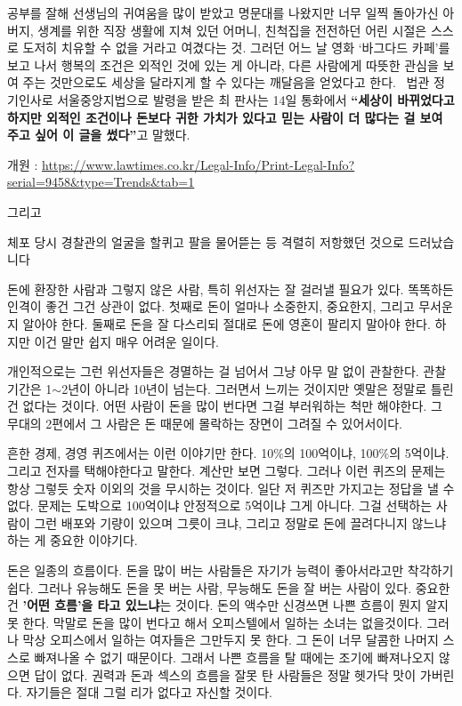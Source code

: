 공부를 잘해 선생님의 귀여움을 많이 받았고 명문대를 나왔지만 너무 일찍 돌아가신 아버지, 생계를 위한 직장 생활에 지쳐 있던 어머니, 친척집을 전전하던 어린 시절은 스스로 도저히 치유할 수 없을 거라고 여겼다는 것.
그러던 어느 날 영화 ‘바그다드 카페’를 보고 나서 행복의 조건은 외적인 것에 있는 게 아니라, 다른 사람에게 따뜻한 관심을 보여 주는 것만으로도 세상을 달라지게 할 수 있다는 깨달음을 얻었다고 한다.  법관 정기인사로 서울중앙지법으로 발령을 받은 최 판사는 14일 통화에서 \textbf{“세상이 바뀌었다고 하지만 외적인 조건이나 돈보다 귀한 가치가 있다고 믿는 사람이 더 많다는 걸 보여 주고 싶어 이 글을 썼다”}고 말했다.
\vspace{5mm}

개원 : \url{https://www.lawtimes.co.kr/Legal-Info/Print-Legal-Info?serial=9458&type=Trends&tab=1}
\vspace{5mm}

그리고
\vspace{5mm}

체포 당시 경찰관의 얼굴을 할퀴고 팔을 물어뜯는 등 격렬히 저항했던 것으로 드러났습니다
\vspace{5mm}

돈에 환장한 사람과 그렇지 않은 사람, 특히 위선자는 잘 걸러낼 필요가 있다.
똑똑하든 인격이 좋건 그건 상관이 없다.
첫째로 돈이 얼마나 소중한지, 중요한지, 그리고 무서운지 알아야 한다.
둘째로 돈을 잘 다스리되 절대로 돈에 영혼이 팔리지 말아야 한다.
하지만 이건 말만 쉽지 매우 어려운 일이다.
\vspace{5mm}

개인적으로는 그런 위선자들은 경멸하는 걸 넘어서 그냥 아무 말 없이 관찰한다. 관찰기간은 1$\sim$2년이 아니라 10년이 넘는다.
그러면서 느끼는 것이지만 옛말은 정말로 틀린 건 없다는 것이다.
어떤 사람이 돈을 많이 번다면 그걸 부러워하는 척만 해야한다.
그 무대의 2편에서 그 사람은 돈 때문에 몰락하는 장면이 그려질 수 있어서이다.
\vspace{5mm}

흔한 경제, 경영 퀴즈에서는 이런 이야기만 한다. 10$\%$의 100억이냐, 100$\%$의 5억이냐. 그리고 전자를 택해야한다고 말한다.
계산만 보면 그렇다. 그러나 이런 퀴즈의 문제는 항상 그렇듯 숫자 이외의 것을 무시하는 것이다.
일단 저 퀴즈만 가지고는 정답을 낼 수 없다. 문제는 도박으로 100억이냐 안정적으로 5억이냐 그게 아니다.
그걸 선택하는 사람이 그런 배포와 기량이 있으며 그릇이 크냐, 그리고 정말로 돈에 끌려다니지 않느냐 하는 게 중요한 이야기다.
\vspace{5mm}

돈은 일종의 흐름이다. 돈을 많이 버는 사람들은 자기가 능력이 좋아서라고만 착각하기 쉽다.
그러나 유능해도 돈을 못 버는 사람, 무능해도 돈을 잘 버는 사람이 있다. 중요한 건 \textbf{'어떤 흐름'을 타고 있느냐}는 것이다.
돈의 액수만 신경쓰면 나쁜 흐름이 뭔지 알지 못 한다. 막말로 돈을 많이 번다고 해서 오피스텔에서 일하는 소녀는 없을것이다.
그러나 막상 오피스에서 일하는 여자들은 그만두지 못 한다. 그 돈이 너무 달콤한 나머지 스스로 빠져나올 수 없기 때문이다.
그래서 나쁜 흐름을 탈 때에는 조기에 빠져나오지 않으면 답이 없다.
권력과 돈과 섹스의 흐름을 잘못 탄 사람들은 정말 헷가닥 맛이 가버린다.
자기들은 절대 그럴 리가 없다고 자신할 것이다.
\vspace{5mm}

